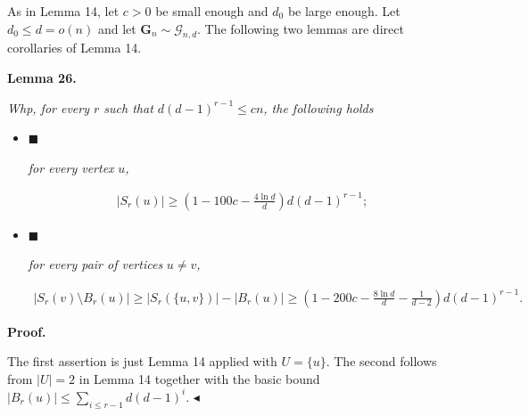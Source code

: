 \documentclass[10pt,a4paper]{article}
\begin{document}
As in Lemma 14, let $c>0$ be small enough and $d_{0}$ be large enough. Let $d_{0}\leq d=o(n)$ and let $\mathbf{G}_{n}\sim\mathcal{G}_{n,d}$. The following two lemmas are direct corollaries of Lemma 14.\par





\par\medskip\noindent\textbf{
\textbf{Lemma 26}\textbf{.}
}\par



\emph{Whp, for every $r$ such that $d(d-1)^{r-1}\leq cn$, the following holds}\par


\begin{itemize}


\item[] 
$\blacksquare$ 


\emph{for every vertex }$u$\emph{,}\par


\[\begin{gathered}
|S_{r}(u)|\geq\left(1-100c-\frac{4\ln d}{d}\right)d(d-1)^{r-1};
\end{gathered}\]





\item[] 
$\blacksquare$ 


\emph{for every pair of vertices }$u\neq v$\emph{,}\par


\[\begin{gathered}
|S_{r}(v)\setminus B_{r}(u)|\geq|S_{r}(\{u,v\})|-|B_{r}(u)|\geq\left(1-200c-\frac{8\ln d}{d}-\frac{1}{d-2}\right)d(d-1)^{r-1}.
\end{gathered}\]





\end{itemize}






\par\medskip\noindent\textbf{Proof.}\par




The first assertion is just Lemma 14 applied with $U=\{u\}$. The second follows from $|U|=2$ in Lemma 14 together with the basic bound $|B_{r}(u)|\leq\sum_{i\leq r-1}d(d-1)^{i}$.
$\blacktriangleleft$\par
\end{document}
